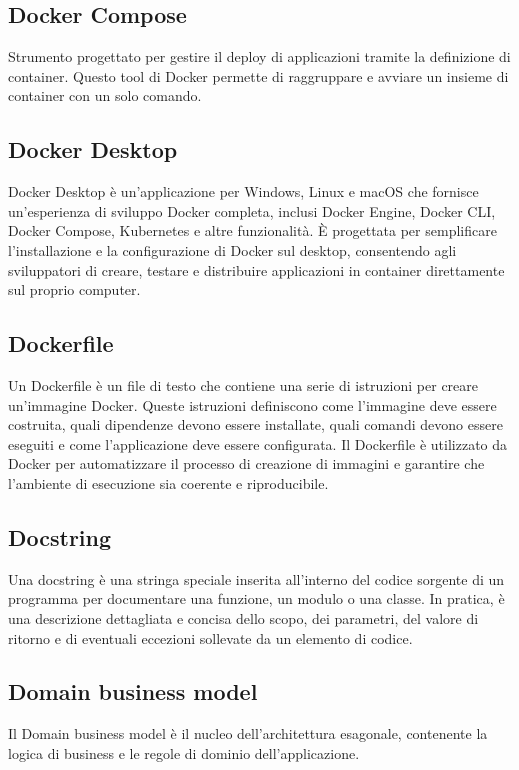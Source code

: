 \hypertarget{sec:docker_compose}{}
\subsection*{Docker Compose}
Strumento progettato per gestire il deploy di applicazioni tramite la definizione di
container. Questo tool di Docker permette di raggruppare e avviare un insieme di
container con un solo comando.

\hypertarget{sec:docker_desktop}{}
\subsection*{Docker Desktop}
Docker Desktop è un'applicazione per Windows, Linux e macOS che fornisce un'esperienza di sviluppo Docker completa, inclusi Docker Engine, Docker CLI, Docker Compose,
Kubernetes e altre funzionalità. È progettata per semplificare l'installazione e la configurazione di Docker sul desktop, consentendo agli sviluppatori di
creare, testare e distribuire applicazioni in container direttamente sul proprio computer.

\hypertarget{sec:dockerfile}{}
\subsection*{Dockerfile}
Un Dockerfile è un file di testo che contiene una serie di istruzioni per creare un'immagine Docker. Queste istruzioni definiscono come l'immagine deve essere
costruita, quali dipendenze devono essere installate, quali comandi devono essere eseguiti e come l'applicazione deve essere configurata. Il Dockerfile è
utilizzato da Docker per automatizzare il processo di creazione di immagini e garantire che l'ambiente di esecuzione sia coerente e riproducibile.

\hypertarget{sec:docstring}{}
\subsection*{Docstring}
Una docstring è una stringa speciale inserita all'interno del codice sorgente di un programma per documentare una funzione, un modulo 
o una classe. In pratica, è una descrizione dettagliata e concisa dello scopo, dei parametri, del valore di ritorno e di eventuali 
eccezioni sollevate da un elemento di codice.

\hypertarget{sec:domain business model}{}
\subsection*{Domain business model}
Il Domain business model è il nucleo dell'architettura esagonale, contenente la logica di business e le regole di dominio dell'applicazione.


